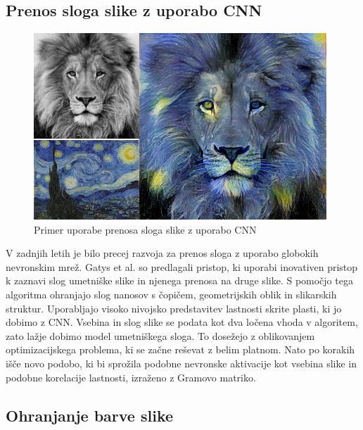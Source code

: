 \documentclass[runningheads,a4paper]{llncs}
\begin{document}
\subsection{Prenos sloga slike z uporabo CNN}
\label{sub:prenos_sloga}

\begin{figure}
\centering
\includegraphics[width=110mm]{figures/prenos_sloga.png}
\caption{Primer uporabe prenosa sloga slike z uporabo CNN}
\label{fig:prenos_sloga}
\end{figure}

V zadnjih letih je bilo precej razvoja za prenos sloga z uporabo globokih nevronskim mrež. Gatys et al. \cite{prenos_sloga} so predlagali pristop, ki uporabi inovativen pristop k zaznavi slog umetniške slike in njenega prenosa na druge slike. S pomočjo tega algoritma ohranjajo slog nanosov s čopičem, geometrijskih oblik in slikarskih struktur. Uporabljajo visoko nivojsko predstavitev lastnosti skrite plasti, ki jo dobimo z CNN. Vsebina in slog slike se podata kot dva ločena vhoda v algoritem, zato lažje dobimo model umetniškega sloga. To dosežejo z oblikovanjem optimizacijskega problema, ki se začne reševat z belim platnom. Nato po korakih išče novo podobo, ki bi sprožila podobne nevronske aktivacije kot vsebina slike in podobne korelacije lastnosti, izraženo z Gramovo matriko.

\subsection{Ohranjanje barve slike}
\end{document}
